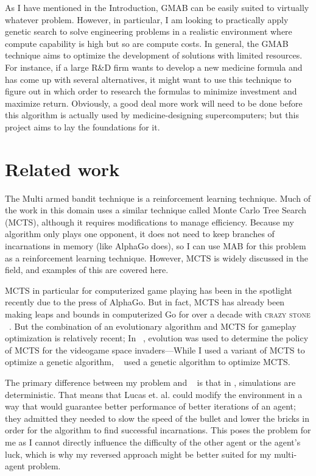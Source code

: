 \documentclass[11pt]{article}
\begin{document}
As I have mentioned in the Introduction, GMAB can be easily suited to virtually whatever problem. However, in particular, I am looking to practically apply genetic search to solve engineering problems in a realistic environment where compute capability is high but so are compute costs. In general, the GMAB technique aims to optimize the development of solutions with limited resources. For instance, if a large R\&D firm wants to develop a new medicine formula and has come up with several alternatives, it might want to use this technique to figure out in which order to research the formulas to minimize investment and maximize return. Obviously, a good deal more work will need to be done before this algorithm is actually used by medicine-designing supercomputers; but this project aims to lay the foundations for it.


\section{Related work} 
\label{sec:rw}

The Multi armed bandit technique is a reinforcement learning technique. Much of the work in this domain uses a similar technique called Monte Carlo Tree Search (MCTS), although it requires modifications to manage efficiency. Because my algorithm only plays one opponent, it does not need to keep branches of incarnations in memory (like AlphaGo does), so I can use MAB for this problem as a reinforcement learning technique. However, MCTS is widely discussed in the field, and examples of this are covered here.

MCTS in particular for computerized game playing has been in the spotlight recently due to the press of AlphaGo. But in fact, MCTS has already been making leaps and bounds in computerized Go for over a decade with \textsc{crazy stone} ~\cite{Coul-06}. But the combination of an evolutionary algorithm and MCTS for gameplay optimization is relatively recent; In ~\cite{Luca-Samo-14}, evolution was used to determine the policy of MCTS for the videogame space invaders---While I used a variant of MCTS to optimize a genetic algorithm, ~\cite{Luca-Samo-14} used a genetic algorithm to optimize MCTS. 


The primary difference between my problem and ~\cite{Luca-Samo-14} is that in \cite{Luca-Samo-14}, simulations are deterministic. That means that Lucas et. al. could modify the environment in a way that would guarantee better performance of better iterations of an agent; they admitted they needed to slow the speed of the bullet and lower the bricks in order for the algorithm to find successful incarnations. This poses the problem for me as I cannot directly influence the difficulty of the other agent or the agent's luck, which is why my reversed approach might be better suited for my multi-agent problem.
\end{document}
